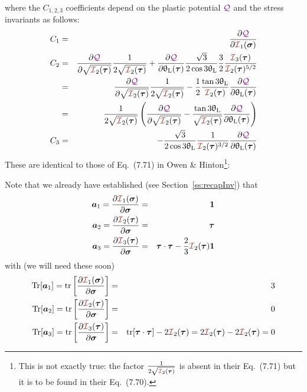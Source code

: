 where the $C_{1,2,3}$ coefficients depend on the plastic potential ${\color{violet}\cal Q}$
and the stress invariants as follows:
\begin{eqnarray}
C_1 &=&  \frac{\partial \QQQ}{\partial {\III}_1(\bm\sigma)} \\
C_2 
&=& \frac{\partial \QQQ}{\partial \sqrt{{\III}_2(\bm\tau)}} 
\frac{1}{2 \sqrt{ {\III}_2(\bm\tau)}   }   
+
\frac{\partial \QQQ}{\partial \uptheta_{\rm L}(\bm\tau)} 
\frac{\sqrt{3}}{2\cos 3\uptheta_{\rm L}}
\frac32  \frac{ {\III}_3(\bm\tau)   }{ {\III}_2(\bm\tau)^{5/2}} \nn\\
&=& 
\frac{\partial \QQQ}{\partial \sqrt{{\III}_2(\bm\tau)}} 
\frac{1}{2 \sqrt{ {\III}_2(\bm\tau)}   }   
-
\frac12
\frac{\tan 3\uptheta_{\rm L}}{ {\III}_2(\bm\tau)}
\frac{\partial \QQQ}{\partial \uptheta_{\rm L}(\bm\tau)}  \nn\\
&=& 
\frac{1}{2 \sqrt{ {\III}_2(\bm\tau)}   }   
\left(
\frac{\partial \QQQ}{\partial \sqrt{{\III}_2(\bm\tau)}} 
-
\frac{\tan 3\uptheta_{\rm L}}{\sqrt {{\III}_2(\bm\tau)}}
\frac{\partial \QQQ}{\partial \uptheta_{\rm L}(\bm\tau)}  
\right) \nn
\\
C_3 &=&  
-
\frac{\sqrt{3}}{2\cos 3\uptheta_{\rm L}}
\frac{1}{{\III}_2(\bm\tau)^{3/2}} 
\frac{\partial \QQQ}{\partial \uptheta_{\rm L}(\bm\tau)} 
\end{eqnarray}
These are identical to those of Eq.~(7.71) in Owen \& Hinton\footnote{This is 
not exactly true: the factor  $\frac{1}{2 \sqrt{ {\III}_2(\bm\tau)} }$
is absent in their Eq.~(7.71) but it is to be found in their Eq.~(7.70).}:
\begin{center}
\end{center}

\noindent Note that we already have established (see Section~\ref{ss:recapInv}) that  
\begin{eqnarray}
{\bm a}_1 =\frac{\partial {\III}_1(\bm\sigma)}{\partial \bm\sigma} &=& {\bm 1} \nn\\
{\bm a}_2 =\frac{\partial {\III}_2(\bm\tau)}{\partial \bm\sigma} &=& {\bm \tau} \nn\\
{\bm a}_3 =\frac{\partial {\III}_3(\bm\tau)}{\partial \bm\sigma} 
&=& \bm\tau\cdot\bm\tau -\frac23  {\III}_2(\bm\tau){\bm 1} \nn
\end{eqnarray}
with (we will need these soon)
\begin{eqnarray}
\textrm{Tr}[{\bm a}_1]=
{\rm tr}\left[ \frac{\partial {\III}_1(\bm\sigma)}{\partial \bm\sigma} \right] &=& 3 \\  
\textrm{Tr}[{\bm a}_2]=
{\rm tr}\left[ \frac{\partial {\III}_2(\bm\tau)}{\partial \bm\sigma}   \right] &=& 0 \\
\textrm{Tr}[{\bm a}_3]=
{\rm tr}\left[ \frac{\partial {\III}_3(\bm\tau)}{\partial \bm\sigma}   \right] &=& 
{\rm tr}[\bm\tau\cdot\bm\tau] - 2  {\III}_2(\bm\tau) = 2  {\III}_2(\bm\tau) -2  {\III}_2(\bm\tau) = 0 
\end{eqnarray}

